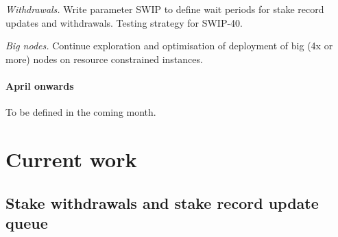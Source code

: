 \emph{Withdrawals.} Write parameter SWIP to define wait periods for stake record updates and withdrawals. Testing strategy for SWIP-40.

\emph{Big nodes.} Continue exploration and optimisation of deployment of big (4x or more) nodes on resource constrained instances.

\paragraph{April onwards}
%
To be defined in the coming month.


\section*{Current work}

\subsection*{Stake withdrawals and stake record update queue}

